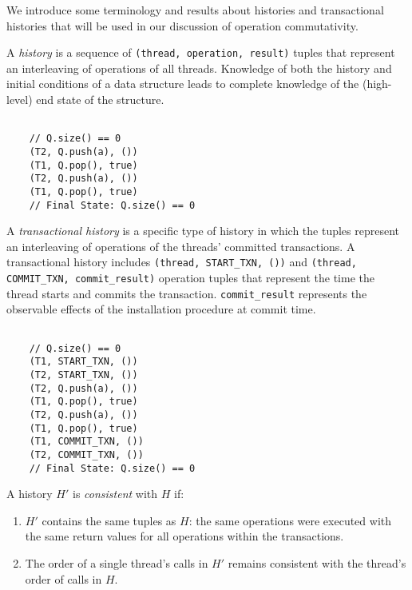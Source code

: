 We introduce some terminology and results about histories and transactional histories that will be used in our discussion of operation commutativity.

\begin{defn}
    A \emph{history} is a sequence of \texttt{(thread, operation, result)} tuples that represent an interleaving of operations of all threads. Knowledge of both the history and initial conditions of a data structure leads to complete knowledge of the (high-level) end state of the structure.
\end{defn}

\begin{eg}
    \singlespacing   

    \begin{lstlisting}

    // Q.size() == 0 
    (T2, Q.push(a), ())
    (T1, Q.pop(), true)
    (T2, Q.push(a), ())
    (T1, Q.pop(), true)
    // Final State: Q.size() == 0 
    \end{lstlisting}
    \doublespacing
\end{eg}
\begin{defn}
    A \emph{transactional history} is a specific type of history in which the tuples represent an interleaving of operations of the threads' committed transactions. A transactional history includes \texttt{(thread, START\_TXN, ())} and \texttt{(thread, COMMIT\_TXN, commit\_result)} operation tuples that represent the time the thread starts and commits the transaction. \texttt{commit\_result} represents the observable effects of the installation procedure at commit time.

\begin{eg}
    \singlespacing   

    \begin{lstlisting}

    // Q.size() == 0 
    (T1, START_TXN, ())
    (T2, START_TXN, ())
    (T2, Q.push(a), ())
    (T1, Q.pop(), true)
    (T2, Q.push(a), ())
    (T1, Q.pop(), true)
    (T1, COMMIT_TXN, ())
    (T2, COMMIT_TXN, ())
    // Final State: Q.size() == 0 
    \end{lstlisting}
    \doublespacing
\end{eg}

\end{defn}

\begin{defn}
    A history $H'$ is \emph{consistent} with $H$ if:
    \begin{enumerate}
        \item $H'$ contains the same tuples as $H$: the same operations were executed with the same return values for all operations within the transactions.
        \item The order of a single thread's calls in $H'$ remains consistent with the thread's order of calls in $H$.
    \end{enumerate}
\end{defn}

